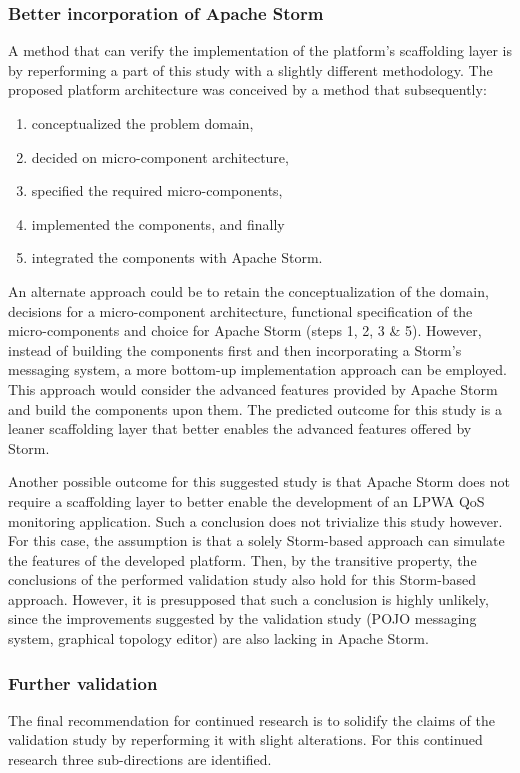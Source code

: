 \subsubsection{Better incorporation of Apache Storm}
A method that can verify the implementation of the  platform's scaffolding layer is by reperforming a part of this study with a slightly different methodology. The proposed platform architecture was conceived by a method that subsequently:
\begin{enumerate}
\nospace
\item conceptualized the problem domain,
\item decided on micro-component architecture,
\item specified the required micro-components,
\item implemented the components, and finally
\item integrated the components with Apache Storm. 
\end{enumerate}
An alternate approach could be to retain the conceptualization of the domain, decisions for a micro-component architecture, functional specification of the micro-components and choice for Apache Storm (steps 1, 2, 3 \& 5). However, instead of building the components first and then incorporating a Storm's messaging system, a more bottom-up implementation approach can be employed. This approach would consider the advanced features provided by Apache Storm and build the components upon them. The predicted outcome for this study is a leaner scaffolding layer that better enables the advanced features offered by Storm.

Another possible outcome for this suggested study is that Apache Storm does not require a scaffolding layer to better enable the development of an LPWA QoS monitoring application. Such a conclusion does not trivialize this study however. For this case, the assumption is that a solely Storm-based approach can simulate the features of the developed platform. Then, by the transitive property, the conclusions of the performed validation study also hold for this Storm-based approach. However, it is presupposed that such a conclusion is highly unlikely, since the improvements suggested by the validation study (POJO messaging system, graphical topology editor) are also lacking in Apache Storm.

\subsubsection{Further validation}
The final recommendation for continued research is to solidify the claims of the validation study by reperforming it with slight alterations. For this continued research three sub-directions are identified.

